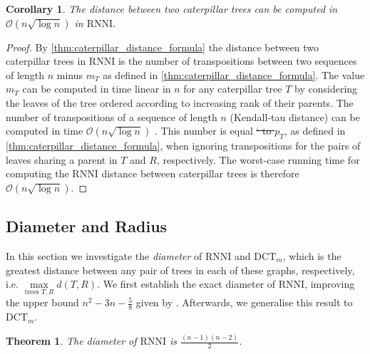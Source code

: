 \documentclass[11pt]{amsart}
\newtheorem{theorem}{Theorem}
\newtheorem{corollary}{Corollary}
\newcommand{\rnni}{\mathrm{RNNI}}
\newcommand{\dct}{\mathrm{DCT}}
\renewcommand{\O}{\mathcal O}
\newcommand{\summary}[1]{} %
\providecommand{\DIFaddtex}[1]{{\protect\color{blue}\uwave{#1}}} %
\providecommand{\DIFdeltex}[1]{{\protect\color{red}\sout{#1}}}                      %
\providecommand{\DIFaddbegin}{} %
\providecommand{\DIFaddend}{} %
\providecommand{\DIFdelbegin}{} %
\providecommand{\DIFdelend}{} %
\providecommand{\DIFadd}[1]{\texorpdfstring{\DIFaddtex{#1}}{#1}} %
\providecommand{\DIFdel}[1]{\texorpdfstring{\DIFdeltex{#1}}{}} %
\newcommand{\DIFscaledelfig}{0.5}
\newlength{\DIFdelgraphicswidth} %
\newlength{\DIFdelgraphicsheight} %
\newcommand{\DIFaddincludegraphics}[2][]{{\color{blue}\fbox{\DIFOincludegraphics[#1]{#2}}}} %
\newcommand{\DIFdelincludegraphics}[2][]{%
\sbox{\DIFdelgraphicsbox}{\DIFOincludegraphics[#1]{#2}}%
\settoboxwidth{\DIFdelgraphicswidth}{\DIFdelgraphicsbox} %
\settoboxtotalheight{\DIFdelgraphicsheight}{\DIFdelgraphicsbox} %
\scalebox{\DIFscaledelfig}{%
\parbox[b]{\DIFdelgraphicswidth}{\usebox{\DIFdelgraphicsbox}\\[-\baselineskip] \rule{\DIFdelgraphicswidth}{0em}}\llap{\resizebox{\DIFdelgraphicswidth}{\DIFdelgraphicsheight}{%
\setlength{\unitlength}{\DIFdelgraphicswidth}%
\begin{picture}(1,1)%
\thicklines\linethickness{2pt} %
{\color[rgb]{1,0,0}\put(0,0){\framebox(1,1){}}}%
{\color[rgb]{1,0,0}\put(0,0){\line( 1,1){1}}}%
{\color[rgb]{1,0,0}\put(0,1){\line(1,-1){1}}}%
\end{picture}%
}\hspace*{3pt}}} %
} %
\DeclareRobustCommand{\DIFaddbegin}{\DIFOaddbegin \let\includegraphics\DIFaddincludegraphics} %
\DeclareRobustCommand{\DIFaddend}{\DIFOaddend \let\includegraphics\DIFOincludegraphics} %
\DeclareRobustCommand{\DIFdelbegin}{\DIFOdelbegin \let\includegraphics\DIFdelincludegraphics} %
\DeclareRobustCommand{\DIFdelend}{\DIFOaddend \let\includegraphics\DIFOincludegraphics} %
\begin{document}
\begin{corollary}
	The distance between two caterpillar trees can be computed in $\O(n \sqrt{\log n})$ in $\rnni$.
	\label{cor:caterpillar_distance_rnni_nlogn}
\end{corollary}
\vspace{-0.66cm}

\begin{proof}
	By \autoref{thm:caterpillar_distance_formula} the distance between two caterpillar trees in $\rnni$ is the number of transpositions between two sequences of length $n$ minus \DIFdelbegin \DIFdel{$m_T$ }\DIFdelend \DIFaddbegin \DIFadd{$m(T,R)$ }\DIFaddend as defined in \autoref{thm:caterpillar_distance_formula}.
	The value \DIFdelbegin \DIFdel{$m_T$ }\DIFdelend \DIFaddbegin \DIFadd{$m(T,R)$ }\DIFaddend can be computed in time linear in $n$ for any caterpillar tree $T$ by considering the leaves of the tree ordered according to increasing rank of their parents.
	The number of transpositions of a sequence of length $n$ (Kendall-tau distance) can be computed in time $\O(n \sqrt{\log n})$ \autocite{Chan2010-ls}.
	This number is equal \DIFdelbegin \DIFdel{` to $p_T$}\DIFdelend \DIFaddbegin \DIFadd{to $p(T,R)$}\DIFaddend , as defined in \autoref{thm:caterpillar_distance_formula}, when ignoring transpositions for the pairs of leaves sharing a parent in $T$ and $R$, respectively.
	The worst-case running time for computing the $\rnni$ distance between caterpillar trees is therefore $\O(n \sqrt{\log n})$.
\end{proof}

\subsection{Diameter and Radius}

\label{section:diameter}
\summary{Definition of Diameter.}
In this section we  investigate the \emph{diameter} of $\rnni$ and $\dct_m$, which is the greatest distance between any pair of trees in each of these graphs, respectively, i.e. $\max\limits_{\text{trees }T,R}d(T,R)$.
We first establish the exact diameter of $\rnni$, improving the upper bound $n^2 - 3n - \frac{5}{8}$ given by \textcite{Gavryushkin2018-ol}.
Afterwards, we generalise this result to $\dct_m$.

\begin{theorem}
	The diameter of $\rnni$ is $\frac{(n-1)(n-2)}{2}$.
	\label{thm:diameter_rnni}
\end{theorem}
\end{document}

